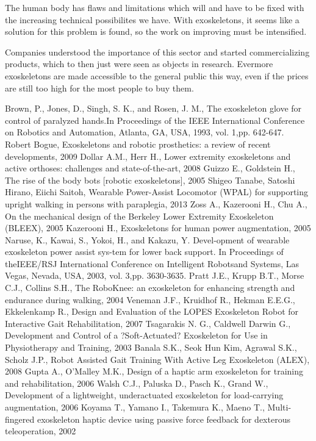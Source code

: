\documentclass[letterpaper, 10 pt, conference]{ieeeconf}  %
\begin{document}
The human body has flaws and limitations which will and have to be fixed with the increasing technical possibilites we have. With exoskeletons, it seems like a solution for this problem is found, so the work on improving must be intensified.


Companies understood the importance of this sector and started commercializing products, which to then just were seen as objects in research. Evermore exoskeletons are made accessible to the general public this way, even if the prices are still too high for the most people to buy them.



\begin{thebibliography}{99}

 Brown, P., Jones, D., Singh, S. K., and Rosen, J. M., The exoskeleton glove for control of paralyzed hands.In Proceedings of the IEEE 
International Conference on Robotics and Automation, Atlanta, GA, USA, 1993, vol. 1,pp. 642-647.
 Robert Bogue, Exoskeletons and robotic prosthetics: a review of recent developments, 2009
 Dollar A.M., Herr H., Lower extremity exoskeletons and active orthoses: challenges and state-of-the-art, 2008
 Guizzo E., Goldstein H., The rise of the body bots [robotic exoskeletons], 2005
 Shigeo Tanabe, Satoshi Hirano, Eiichi Saitoh, Wearable Power-Assist Locomotor (WPAL) for supporting upright walking in persons with paraplegia, 2013
 Zoss A., Kazerooni H., Chu A., On the mechanical design of the Berkeley Lower Extremity Exoskeleton (BLEEX), 2005 
 Kazerooni H., Exoskeletons for human power augmentation, 2005
 Naruse, K., Kawai, S., Yokoi, H., and Kakazu, Y. Devel-opment of wearable exoskeleton power assist sys-tem for lower back support. In Proceedings of theIEEE/RSJ International Conference on Intelligent Robotsand Systems, Las Vegas, Nevada, USA, 2003, vol. 3,pp. 3630-3635.
 Pratt J.E., Krupp B.T., Morse C.J., Collins S.H., The RoboKnee: an exoskeleton for enhancing strength and endurance during walking, 2004
 Veneman J.F., Kruidhof R., Hekman E.E.G., Ekkelenkamp R., Design and Evaluation of the LOPES Exoskeleton Robot for Interactive Gait Rehabilitation, 2007
 Tsagarakis N. G., Caldwell Darwin G., Development and Control of a ?Soft-Actuated? Exoskeleton for Use in Physiotherapy and Training, 2003
 Banala S.K., Seok Hun Kim, Agrawal S.K., Scholz J.P., Robot Assisted Gait Training With Active Leg Exoskeleton (ALEX), 2008
 Gupta A., O'Malley M.K., Design of a haptic arm exoskeleton for training and rehabilitation, 2006 
 Walsh C.J., Paluska D., Pasch K., Grand W., Development of a lightweight, underactuated exoskeleton for load-carrying augmentation, 2006
 Koyama T., Yamano I., Takemura K., Maeno T., Multi-fingered exoskeleton haptic device using passive force feedback for dexterous teleoperation, 2002

\end{thebibliography}
\end{document}
